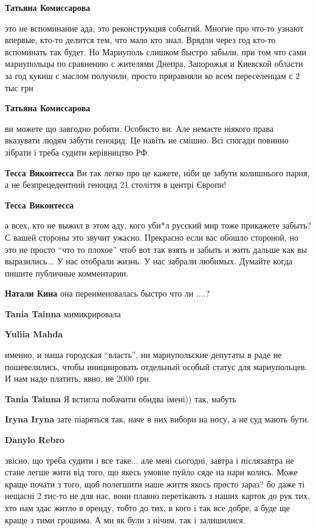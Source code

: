 \begin{itemize} %
\textbf{Татьяна Комиссарова} 

это не вспоминание ада, это реконструкция событий. Многие про что-то узнают
впервые, кто-то делится тем, что мало кто знал. Врядли через год кто-то
вспоминать так будет. Но Мариуполь слишком быстро забыли, при том что сами
мариупольцы по сравнению с жителями Днепра, Запорожья и Киевской области за год
кукиш с маслом получили, просто приравняли ко всем переселенцам с 2 тыс грн

\textbf{Татьяна Комиссарова} 

ви можете що завгодно робити. Особисто ви. Але немаєте ніякого права вказувати
людям забути геноцид. Це навіть не смішно. Всі спогади повинно зібрати і треба
судити керівництво РФ.

\textbf{Тесса Виконтесса} Ви так легко про це кажете, ніби це забути колишнього парня, а не безпрецедентний геноцид 21 століття в центрі Європи!

\textbf{Тесса Виконтесса} 

а всех, кто не выжил в этом аду, кого уби*л русский мир тоже прикажете забыть?
С вашей стороны это звучит ужасно. Прекрасно если вас обошло стороной, но это
не просто \enquote{что то плохое} чтоб вот так взять и забыть и жить дальше как вы
выразились... У нас отобрали жизнь. У нас забрали любимых. Думайте когда пишите
публичные комментарии.

\textbf{Натали Кина} она переименовалась быстро что ли ....?

\textbf{Tania Tainna} мимикрировала

\textbf{Yuliia Mahda} 

именно, и наша городская \enquote{власть}, ни мариупольские депутаты в раде не
пошевелились, чтобы инициировать отдельный особый статус для мариупольцев. И
нам надо платить, явно, не 2000 грн.

\textbf{Tania Tainna} Я встигла побачити обидва імені)) так, мабуть

\textbf{Iryna Iryna} зате піаряться так, наче в них вибори на носу, а не суд мають бути.

\textbf{Danylo Rebro} 

звісно, що треба судити і все таке... але мені сьогодні, завтра і післязавтра не
стане легше жити від того, що якесь умовне пуйло сяде на нари колись. Може краще
почати з того, щоб полегшити наше життя якось просто зараз? бо даже ті нещасні 2
тис-то не для нас, вони плавно перетікають з наших карток до рук тих, хто нам
здає житло в оренду, тобто до тих, в кого і так все добре, а буде ще краще з тими
грошима. А ми як були з нічим, так і залишилися.


\end{itemize}
